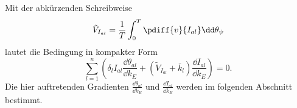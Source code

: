 %
%
%
Mit der abkürzenden Schreibweise
\begin{equation}
		\tilde{V}_{I_{al}} = \frac{1}{T} \int_0^T{\pdiff{v}{{I_{al}}} \dd \theta_{\psi}}
		\label{eq:OptAbkuerzungVonVTerm}
\end{equation}
%
%
lautet die Bedingung in kompakter Form
%
% 
\begin{equation}
			\sum_{l=1}^{n} { \left(   \delta_l I_{al}  \frac{\dd \theta_{al}}{\dd k_E} 
		  + \left( \tilde{V}_{I_{al}}  +  \bar{k}_l \right)  \frac{\dd I_{al}}{\dd k_E}    \right) } 	= 0.
			\label{eq:OptMinimumsbedingungKompakt}
\end{equation}
%
Die hier auftretenden Gradienten $\frac{\dd \theta_{al}}{\dd k_E}$ und $\frac{\dd I_{al}}{\dd k_E}$ werden im folgenden Abschnitt bestimmt.























